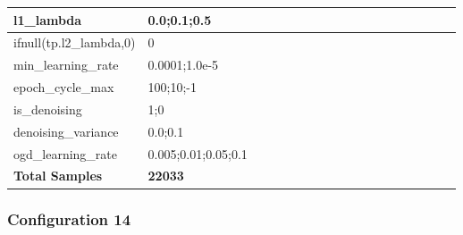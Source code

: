 \documentclass[a4paper,11pt,oneside]{article}
\theoremstyle{plain}
\theoremstyle{definition}
\begin{document}
\begin{longtable}[H]{|p{0.3\linewidth}|p{0.7\linewidth}|}
		{l1\_lambda} & {0.0;0.1;0.5} \\\hline
		{ifnull(tp.l2\_lambda,0)} & {0} \\\hline
		{min\_learning\_rate} & {0.0001;1.0e-5} \\\hline
		{epoch\_cycle\_max} & {100;10;-1} \\\hline
		{is\_denoising} & {1;0} \\\hline
		{denoising\_variance} & {0.0;0.1} \\\hline
		{ogd\_learning\_rate} & {0.005;0.01;0.05;0.1} \\\hline
		{\textbf{Total Samples}} & {\textbf{22033}} \\\hline
	\end{longtable}
	
	\newpage
	\subsubsection{Configuration 14}\label{config14}
\end{document}

